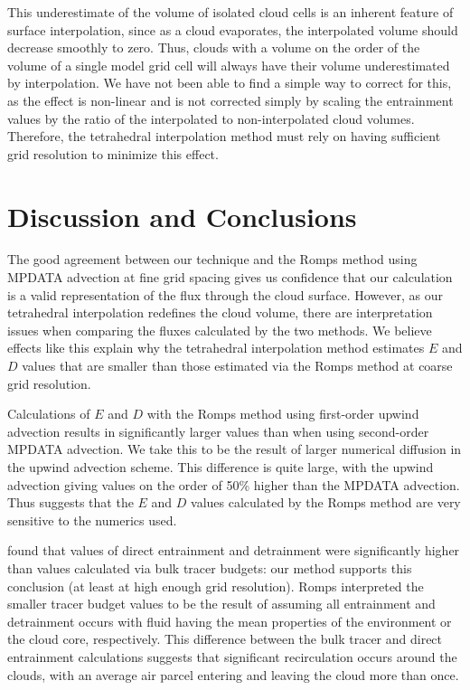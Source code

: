\documentclass[12pt]{article}
\begin{document}
This underestimate of the volume of isolated cloud cells is an inherent 
feature of surface interpolation, since as a cloud evaporates, the 
interpolated volume should decrease smoothly to zero.  Thus, clouds with a 
volume on the order of the volume of a single model grid cell will always have 
their volume underestimated by interpolation.  We have not been able to find a 
simple way to correct for this, as the effect is non-linear and is not 
corrected simply by scaling the entrainment values by the ratio of the 
interpolated to non-interpolated cloud volumes.  Therefore, the tetrahedral 
interpolation method must rely on having sufficient grid resolution to minimize 
this effect.


\section{Discussion and Conclusions}

The good agreement between our technique and the Romps method using MPDATA 
advection at fine grid spacing gives us confidence that our calculation is a 
valid representation of the flux through the cloud surface.  However, as our 
tetrahedral interpolation redefines the cloud volume, there are interpretation 
issues when comparing the fluxes calculated by the two methods.  We believe 
effects like this explain why the tetrahedral interpolation method estimates 
$E$ and $D$ values that are smaller than those estimated via the Romps method 
at coarse grid resolution.

Calculations of $E$ and $D$ with the Romps method using first-order upwind 
advection results in significantly larger values than when using 
second-order MPDATA advection.  We take this to be the result of larger 
numerical diffusion in the upwind advection scheme.  This difference is quite 
large, with the upwind advection giving values on the order of 50\% higher than 
the MPDATA advection.  Thus suggests that the $E$ and $D$ values calculated by 
the Romps method are very sensitive to the numerics used. 

\citet{Romps2010} found that values of direct entrainment and detrainment were 
significantly higher than values calculated via bulk tracer budgets: our 
method supports this conclusion (at least at high enough grid resolution).  
Romps interpreted the smaller tracer budget values to be the result of assuming
all entrainment and detrainment occurs with fluid having the mean properties of
the environment or the cloud core, respectively.  This difference between the 
bulk tracer and direct entrainment calculations suggests that significant 
recirculation occurs around the clouds, with an average air parcel entering 
and leaving the cloud more than once.  
\end{document}
